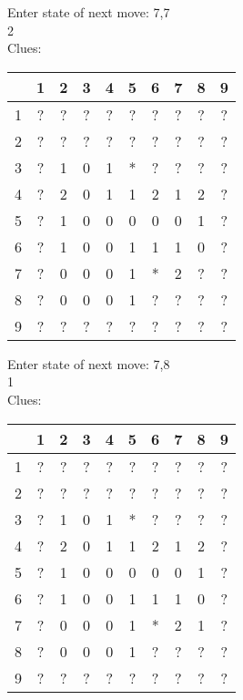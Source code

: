 Enter state of next move: 7,7\\
2\\
Clues:\\
\begin{tabular}{|c|c|c|c|c|c|c|c|c|c|}
\hline
  & 1 & 2 & 3 & 4 & 5 & 6 & 7 & 8 & 9\\
\hline
1 & ? & ? & ? & ? & ? & ? & ? & ? & ?\\
\hline
2 & ? & ? & ? & ? & ? & ? & ? & ? & ?\\
\hline
3 & ? & 1 & 0 & 1 & * & ? & ? & ? & ?\\
\hline
4 & ? & 2 & 0 & 1 & 1 & 2 & 1 & 2 & ?\\
\hline
5 & ? & 1 & 0 & 0 & 0 & 0 & 0 & 1 & ?\\
\hline
6 & ? & 1 & 0 & 0 & 1 & 1 & 1 & 0 & ?\\
\hline
7 & ? & 0 & 0 & 0 & 1 & * & 2 & ? & ?\\
\hline
8 & ? & 0 & 0 & 0 & 1 & ? & ? & ? & ?\\
\hline
9 & ? & ? & ? & ? & ? & ? & ? & ? & ?\\
\hline
\end{tabular}

Enter state of next move: 7,8\\
1\\
Clues:\\
\begin{tabular}{|c|c|c|c|c|c|c|c|c|c|}
\hline
  & 1 & 2 & 3 & 4 & 5 & 6 & 7 & 8 & 9\\
\hline
1 & ? & ? & ? & ? & ? & ? & ? & ? & ?\\
\hline
2 & ? & ? & ? & ? & ? & ? & ? & ? & ?\\
\hline
3 & ? & 1 & 0 & 1 & * & ? & ? & ? & ?\\
\hline
4 & ? & 2 & 0 & 1 & 1 & 2 & 1 & 2 & ?\\
\hline
5 & ? & 1 & 0 & 0 & 0 & 0 & 0 & 1 & ?\\
\hline
6 & ? & 1 & 0 & 0 & 1 & 1 & 1 & 0 & ?\\
\hline
7 & ? & 0 & 0 & 0 & 1 & * & 2 & 1 & ?\\
\hline
8 & ? & 0 & 0 & 0 & 1 & ? & ? & ? & ?\\
\hline
9 & ? & ? & ? & ? & ? & ? & ? & ? & ?\\
\hline
\end{tabular}

